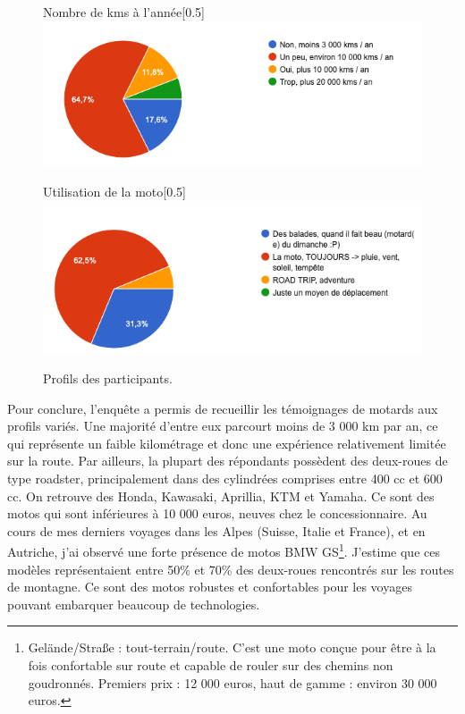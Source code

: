 \begin{figure}[H]
  \begin{subcaptionbox}{Nombre de kms à l'année}[0.5\linewidth]
    {\includegraphics[width=\linewidth]{coeur_memoire/graphique/nb_km_an.png}}
  \end{subcaptionbox}
  \hfill
  \begin{subcaptionbox}{Utilisation de la moto}[0.5\linewidth]
    {\includegraphics[width=\linewidth]{coeur_memoire/graphique/utilisation_moto.png}}
  \end{subcaptionbox}
  \caption{Profils des participants.}
\end{figure}
Pour conclure, l’enquête a permis de recueillir les témoignages de motards aux profils variés. Une majorité d’entre eux parcourt moins de 3 000 km par an, ce qui représente un faible kilométrage et donc une expérience relativement limitée sur la route. Par ailleurs, la plupart des répondants possèdent des deux-roues de type roadster, principalement dans des cylindrées comprises entre 400 cc et 600 cc. On retrouve des Honda, Kawasaki, Aprillia, KTM et Yamaha. Ce sont des motos qui sont inférieures à 10 000 euros, neuves chez le concessionnaire.
Au cours de mes derniers voyages dans les Alpes (Suisse, Italie et France), et en Autriche, j’ai observé une forte présence de motos BMW GS\footnote{Gelände/Straße : tout-terrain/route. C'est une moto conçue pour être à la fois confortable sur route et capable de rouler sur des chemins non goudronnés. Premiers prix : 12 000 euros, haut de gamme : environ 30 000 euros.}. J’estime que ces modèles représentaient entre 50\% et 70\% des deux-roues rencontrés sur les routes de montagne. Ce sont des motos robustes et confortables pour les voyages pouvant embarquer beaucoup de technologies. \\
